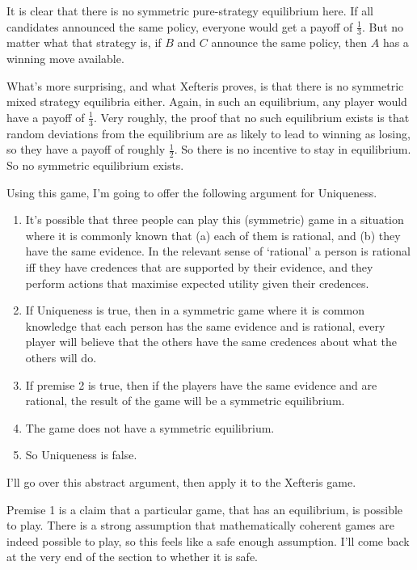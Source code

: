 \documentclass[
  11pt,
]{article}
\providecommand{\tightlist}{%
  \setlength{\itemsep}{0pt}\setlength{\parskip}{0pt}}
\begin{document}
It is clear that there is no symmetric pure-strategy equilibrium here. If all candidates announced the same policy, everyone would get a payoff of \(\frac{1}{3}\). But no matter what that strategy is, if \(B\) and \(C\) announce the same policy, then \(A\) has a winning move available.

What's more surprising, and what Xefteris proves, is that there is no symmetric mixed strategy equilibria either. Again, in such an equilibrium, any player would have a payoff of \(\frac{1}{3}\). Very roughly, the proof that no such equilibrium exists is that random deviations from the equilibrium are as likely to lead to winning as losing, so they have a payoff of roughly \(\frac{1}{2}\). So there is no incentive to stay in equilibrium. So no symmetric equilibrium exists.

Using this game, I'm going to offer the following argument for Uniqueness.

\begin{enumerate}
\def\labelenumi{\arabic{enumi}.}
\tightlist
\item
  It's possible that three people can play this (symmetric) game in a situation where it is commonly known that (a) each of them is rational, and (b) they have the same evidence. In the relevant sense of `rational' a person is rational iff they have credences that are supported by their evidence, and they perform actions that maximise expected utility given their credences.
\item
  If Uniqueness is true, then in a symmetric game where it is common knowledge that each person has the same evidence and is rational, every player will believe that the others have the same credences about what the others will do.
\item
  If premise 2 is true, then if the players have the same evidence and are rational, the result of the game will be a symmetric equilibrium.
\item
  The game does not have a symmetric equilibrium.
\item
  So Uniqueness is false.
\end{enumerate}

I'll go over this abstract argument, then apply it to the Xefteris game.

Premise 1 is a claim that a particular game, that has an equilibrium, is possible to play. There is a strong assumption that mathematically coherent games are indeed possible to play, so this feels like a safe enough assumption. I'll come back at the very end of the section to whether it is safe.
\end{document}
